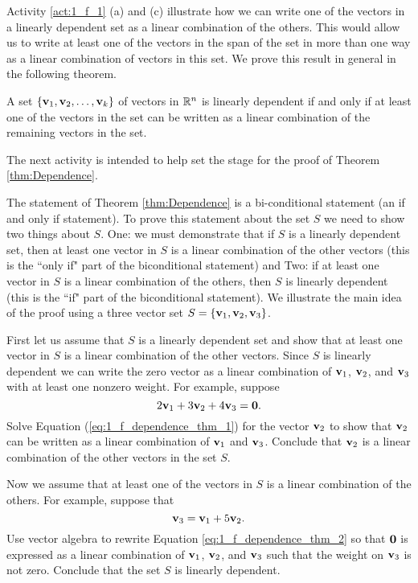 Activity \ref{act:1_f_1} (a) and (c) illustrate how we can write one of the vectors in a linearly dependent set as a linear combination of the others. This would allow us to write at least one of the vectors in the span of the set in more than one way as a linear combination of vectors in this set. We prove this result in general in the following theorem.

\begin{theorem} \label{thm:Dependence} A set $\{\mathbf{v}_1, \mathbf{v}_2, \ldots, \mathbf{v}_k\}$ of vectors in $\mathbb{R}^n$ is linearly dependent if and only if at least one of the vectors in the set can be written as a linear combination of the remaining vectors in the set.
\end{theorem}

The next activity is intended to help set the stage for the proof of Theorem \ref{thm:Dependence}. 

\begin{activity} \label{act:1_f_1b} The statement of Theorem \ref{thm:Dependence} is a bi-conditional statement (an if and only if statement). To prove this statement about the set $S$ we need to show two things about $S$. One: we must demonstrate that if $S$ is a linearly dependent set, then at least one vector in $S$ is a linear combination of the other vectors (this is the ``only if" part of the biconditional statement) and Two: if at least one vector in $S$ is a linear combination of the others, then $S$ is linearly dependent (this is the ``if" part of the biconditional statement). We illustrate the main idea of the proof using a three vector set $S = \{\mathbf{v}_1, \mathbf{v}_2, \mathbf{v}_3\}$. 
	\ba
	\item First let us assume that $S$ is a linearly dependent set and show that at least one vector in $S$ is a linear combination of the other vectors. Since $S$ is linearly dependent we can write the zero vector as a linear combination of $\mathbf{v}_1$, $\mathbf{v}_2$, and $\mathbf{v}_3$ with at least one nonzero weight. For example, suppose 
\begin{equation} \label{eq:1_f_dependence_thm_1}
2\mathbf{v}_1 + 3\mathbf{v}_2 + 4\mathbf{v}_3 = \mathbf{0}.
\end{equation}
Solve Equation (\ref{eq:1_f_dependence_thm_1}) for the vector $\mathbf{v}_2$ to show that $\mathbf{v}_2$ can be written as a linear combination of $\mathbf{v}_1$ and $\mathbf{v}_3$. Conclude that $\mathbf{v}_2$ is a linear combination of the other vectors in the set $S$. 

	\item Now we assume that at least one of the vectors in $S$ is a linear combination of the others. For example, suppose that
\begin{equation} \label{eq:1_f_dependence_thm_2}
 \mathbf{v}_3 = \mathbf{v}_1 + 5\mathbf{v}_2.
\end{equation}
Use vector algebra to rewrite Equation \ref{eq:1_f_dependence_thm_2} so that $\mathbf{0}$ is expressed as a linear combination of $\mathbf{v}_1$, $\mathbf{v}_2$, and $\mathbf{v}_3$ such that the weight on $\mathbf{v}_3$ is not zero. Conclude that the set $S$ is linearly dependent. 

	\ea
	
\end{activity}

